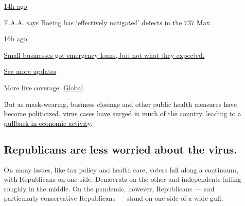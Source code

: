\href{https://www.nytimes.com/live/2020/08/03/business/stock-market-today-coronavirus?action=click\&pgtype=Article\&state=default\&region=MAIN_CONTENT_1\&context=storylines_live_updates\#faa-says-boeing-has-effectively-mitigated-defects-in-the-737-max}{14h
ago}

\href{https://www.nytimes.com/live/2020/08/03/business/stock-market-today-coronavirus?action=click\&pgtype=Article\&state=default\&region=MAIN_CONTENT_1\&context=storylines_live_updates\#faa-says-boeing-has-effectively-mitigated-defects-in-the-737-max}{F.A.A.
says Boeing has `effectively mitigated' defects in the 737 Max.}

\href{https://www.nytimes.com/live/2020/08/03/business/stock-market-today-coronavirus?action=click\&pgtype=Article\&state=default\&region=MAIN_CONTENT_1\&context=storylines_live_updates\#small-businesses-got-emergency-loans-but-not-what-they-expected}{16h
ago}

\href{https://www.nytimes.com/live/2020/08/03/business/stock-market-today-coronavirus?action=click\&pgtype=Article\&state=default\&region=MAIN_CONTENT_1\&context=storylines_live_updates\#small-businesses-got-emergency-loans-but-not-what-they-expected}{Small
businesses got emergency loans, but not what they expected.}

\href{https://www.nytimes.com/live/2020/08/03/business/stock-market-today-coronavirus?action=click\&pgtype=Article\&state=default\&region=MAIN_CONTENT_1\&context=storylines_live_updates}{See
more updates}

More live coverage:
\href{https://www.nytimes.com/2020/08/04/world/coronavirus-covid-19.html?action=click\&pgtype=Article\&state=default\&region=MAIN_CONTENT_1\&context=storylines_live_updates}{Global}

But as mask-wearing, business closings and other public health measures
have become politicized, virus cases have surged in much of the country,
leading to a
\href{https://www.nytimes.com/2020/07/15/business/economy/economic-recovery-coronavirus-resurgence.html}{pullback
in economic activity}.

\hypertarget{republicans-are-less-worried-about-the-virus}{%
\subsection{Republicans are less worried about the
virus.}\label{republicans-are-less-worried-about-the-virus}}

On many issues, like tax policy and health care, voters fall along a
continuum, with Republicans on one side, Democrats on the other and
independents falling roughly in the middle. On the pandemic, however,
Republicans --- and particularly conservative Republicans --- stand on
one side of a wide gulf.

